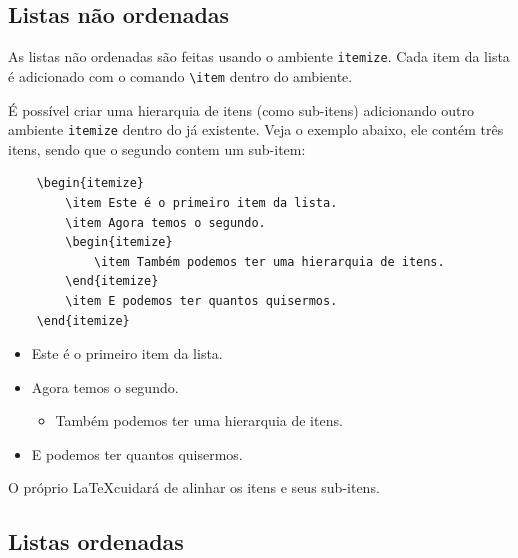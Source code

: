 \subsection{Listas não ordenadas}
\label{sec:listas_nao_ordenadas}

As listas não ordenadas são feitas usando o ambiente \verb=itemize=. Cada item da lista é adicionado com o comando \verb=\item= dentro do ambiente.

É possível criar uma hierarquia de itens (como sub-itens) adicionando outro ambiente \verb=itemize= dentro do já existente. Veja o exemplo abaixo, ele contém três itens, sendo que o segundo contem um sub-item:

\begin{verbatim}
    \begin{itemize}
        \item Este é o primeiro item da lista.
        \item Agora temos o segundo.
        \begin{itemize}
            \item Também podemos ter uma hierarquia de itens.
        \end{itemize}
        \item E podemos ter quantos quisermos.
    \end{itemize}    
\end{verbatim}

\begin{itemize}
    \item Este é o primeiro item da lista.
    
    \item Agora temos o segundo.
    
    \begin{itemize}
        \item Também podemos ter uma hierarquia de itens.
    \end{itemize}
    
    \item E podemos ter quantos quisermos.
\end{itemize}

O próprio \LaTeX\space cuidará de alinhar os itens e seus sub-itens.

\subsection{Listas ordenadas}
\label{sec:listas_ordenadas}


